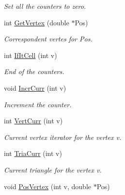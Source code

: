 \begin{DoxyCompactItemize}
\begin{DoxyCompactList}\small\item\em \-Set all the counters to zero. \end{DoxyCompactList}\item 
\hypertarget{classNeiVertex_a330eb7ef3b6ff289f9428fd4994209af}{int \hyperlink{classNeiVertex_a330eb7ef3b6ff289f9428fd4994209af}{\-Get\-Vertex} (double $\ast$\-Pos)}\label{classNeiVertex_a330eb7ef3b6ff289f9428fd4994209af}

\begin{DoxyCompactList}\small\item\em \-Correspondent vertes for \-Pos. \end{DoxyCompactList}\item 
\hypertarget{classNeiVertex_adb170c151213885180aba70f23ac7452}{int \hyperlink{classNeiVertex_adb170c151213885180aba70f23ac7452}{\-If\-It\-Cell} (int v)}\label{classNeiVertex_adb170c151213885180aba70f23ac7452}

\begin{DoxyCompactList}\small\item\em \-End of the counters. \end{DoxyCompactList}\item 
\hypertarget{classNeiVertex_afefd8d5278268d8224caba5312860e5d}{void \hyperlink{classNeiVertex_afefd8d5278268d8224caba5312860e5d}{\-Incr\-Curr} (int v)}\label{classNeiVertex_afefd8d5278268d8224caba5312860e5d}

\begin{DoxyCompactList}\small\item\em \-Increment the counter. \end{DoxyCompactList}\item 
\hypertarget{classNeiVertex_a072488de60aa6fce524b79855cb53ec5}{int \hyperlink{classNeiVertex_a072488de60aa6fce524b79855cb53ec5}{\-Vert\-Curr} (int v)}\label{classNeiVertex_a072488de60aa6fce524b79855cb53ec5}

\begin{DoxyCompactList}\small\item\em \-Current vertex iterator for the vertex v. \end{DoxyCompactList}\item 
\hypertarget{classNeiVertex_aebbce34f5213484c16fe08591fe0f8d7}{int \hyperlink{classNeiVertex_aebbce34f5213484c16fe08591fe0f8d7}{\-Tria\-Curr} (int v)}\label{classNeiVertex_aebbce34f5213484c16fe08591fe0f8d7}

\begin{DoxyCompactList}\small\item\em \-Current triangle for the vertex v. \end{DoxyCompactList}\item 
\hypertarget{classNeiVertex_a81093b4cb48a3e1598c724287c410a9d}{void \hyperlink{classNeiVertex_a81093b4cb48a3e1598c724287c410a9d}{\-Pos\-Vertex} (int v, double $\ast$\-Pos)}\label{classNeiVertex_a81093b4cb48a3e1598c724287c410a9d}


\end{DoxyCompactItemize}
